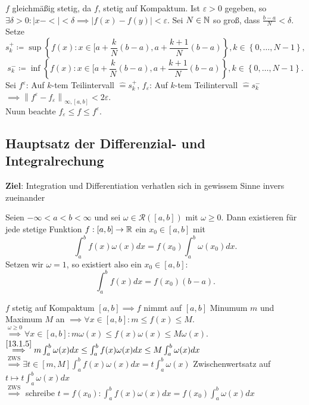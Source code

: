 \begin{subproof*}
	$ f $ gleichmäßig stetig, da $ f $, stetig auf Kompaktum. Ist $ \varepsilon > 0 $ gegeben, so $ \exists \delta > 0: \left| x - < \right| < \delta \implies \left| f(x) - f(y) \right| < \varepsilon  $. Sei $ N \in \mathbb{N}  $ so groß, dass $ \frac{ b - a }{ N } < \delta $. Setze
	\[
		s_k^{+} \coloneqq \sup \left\{ f(x): x \in [ a + \frac{ k }{ N } (b - a), a + \frac{k+1}{ N } (b - a) \right\} , k \in \left\{ 0, \dotsc, N - 1 \right\},
	\]
	\[
		s_k^{-} \coloneqq \inf \left\{ f(x): x \in [ a + \frac{ k }{ N } (b - a), a + \frac{k+1}{ N } (b - a) \right\} , k \in \left\{ 0, \dotsc, N - 1 \right\}.
	\]
	Sei $ f^{\varepsilon } $: Auf $ k $-tem Teilintervall $ \hat{=} s_k^{+}  $, 
	$ f_{\varepsilon } $: Auf $ k $-tem Teilintervall $ \hat{=} s_k^{-}  $\\
	$ \implies \left\| f^{\varepsilon } - f_{\varepsilon } \right\|_{\infty, [a, b]} < 2 \varepsilon   $.\\
	Nuun beachte $ f_{\varepsilon } \leq f \leq f^{\varepsilon }  $.
\end{subproof*}

\subsection{Hauptsatz der Differenzial- und Integralrechung}
\textbf{Ziel}: Integration und Differentiation verhatlen sich in gewissem Sinne invers zueinander

\begin{subtheorem}
	Seien $ -\infty < a < b < \infty $ und sei $ \omega \in \mathcal{R} ([a, b]) $ mit $ \omega \geq 0 $. Dann existieren für jede stetige Funktion $ f: [a, b] \to \mathbb{R}  $ ein $ x_0 \in [a, b] $ mit
	\[
		\int_{a}^{b} f(x) \omega(x) dx = f(x_0) \int_{a}^{b}\omega(x_0) dx.
	\]
	Setzen wir $ \omega = 1 $, so existiert also ein $ x_0 \in [a, b] $:
	\[
		\int_{a}^{b} f(x) dx = f(x_0) (b-a).
	\]
	
\end{subtheorem}

\begin{subproof*}
	$ f $ stetig auf Kompaktum $ [a, b] \implies f $ nimmt auf $ [a, b] $ Minumum $ m $ und Maximum $ M $ an $ \implies \forall x \in [a, b] : m \leq  f(x) \leq  M $. \\
	$ \overset{\omega \geq 0}{\implies } \forall x \in [a, b]: m \omega(x) \leq  f(x) \omega(x) \leq  M \omega(x) $.\\
	$ \overset{\ref{13.1.5}}{\implies }  m \int_{a}^{b} \omega(x) dx \leq  \int_{a}^{b} f(x) \omega(x) dx \leq M \int_{a}^{b} \omega(x) dx $\\
	$ \overset{\text{ZWS} }{\implies } \exists t \in [m, M] \int_{a}^{b} f(x) \omega(x) dx = t \int_{a}^{b} \omega(x) $ Zwischenwertsatz auf $ t \mapsto t \int_{a}^{b} \omega(x) dx $\\
	$ \overset{\text{ZWS} }{\implies } $ schreibe $ t = f(x_0) : \int_{a}^{b} f(x) \omega(x) dx = f(x_0) \int_{a}^{b} \omega(x) dx $
\end{subproof*}


